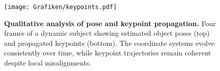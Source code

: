 \begin{figure}[t]
    \centering
    \texttt{[image: Grafiken/keypoints.pdf]}
    \caption{
        \textbf{Qualitative analysis of pose and keypoint propagation.}
        Four frames of a dynamic subject showing estimated object poses (top) and propagated keypoints (bottom).
        The coordinate systems evolve consistently over time, while keypoint trajectories remain coherent despite local misalignments.
    }
    \label{fig:keypoints}
\end{figure}




